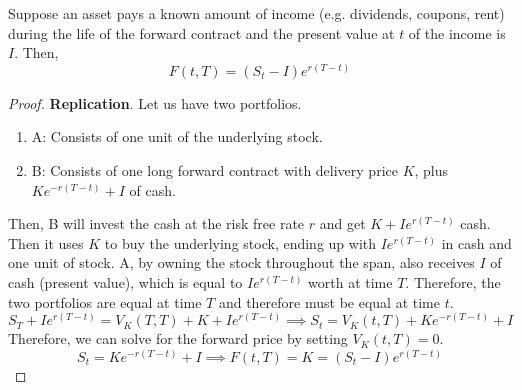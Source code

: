 \documentclass{article}
\begin{document}
    \begin{theorem}
      Suppose an asset pays a known amount of income (e.g. dividends, coupons, rent) during the life of the forward contract and the present value at $t$ of the income is $I$. Then, 
      \begin{equation}
        F(t, T) = (S_t - I)e^{r(T - t)}
      \end{equation}
    \end{theorem}
    \begin{proof}
      \textbf{Replication}. Let us have two portfolios. 
      \begin{enumerate}
        \item A: Consists of one unit of the underlying stock. 
        \item B: Consists of one long forward contract with delivery price $K$, plus $K e^{-r(T - t)} + I$ of cash. 
      \end{enumerate}
      Then, B will invest the cash at the risk free rate $r$ and get $K + I e^{r(T - t)}$ cash. Then it uses $K$ to buy the underlying stock, ending up with $I e^{r(T - t)}$ in cash and one unit of stock. A, by owning the stock throughout the span, also receives $I$ of cash (present value), which is equal to $I e^{r(T - t)}$ worth at time $T$. Therefore, the two portfolios are equal at time $T$ and therefore must be equal at time $t$. 
      \begin{equation}
        S_T + I e^{r(T - t)} = V_K (T, T) + K + I e^{r(T - t)} \implies S_t = V_K (t, T) + K e^{-r(T - t)} + I
      \end{equation}
      Therefore, we can solve for the forward price by setting $V_K(t, T) = 0$. 
      \begin{equation}
        S_t = K e^{-r(T - t)} + I \implies F(t, T) = K = (S_t - I) e^{r(T - t)}
      \end{equation}
    \end{proof}
\end{document}

